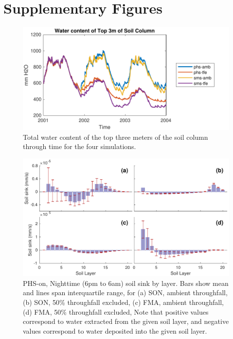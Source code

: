 \documentclass[draft,linenumbers]{agujournal}
\begin{document}
  
  



  


\clearpage

\appendix

\section{Supplementary Figures}

      \begin{figure}[h]
     \centering
     \includegraphics[width=30pc]{../figs2/top3m.pdf}
     \caption{Total water content of the top three meters of the soil column through time for the four simulations.}
     \label{top3m}
  \end{figure}
  \clearpage

    \begin{figure}[h]
     \centering
     \includegraphics[width=30pc]{../figs2/fig10.pdf}
     \caption{PHS-on, Nighttime (6pm to 6am)  soil sink by layer.
          Bars show mean and lines span interquartile range, for 
     (a) SON, ambient throughfall,
     (b) SON, 50\% throughfall excluded,
     (c) FMA, ambient throughfall,
     (d) FMA, 50\% throughfall excluded,
     Note that positive values correspond to water extracted from the given soil layer, 
     and negative values correspond to water deposited into the given soil layer.}
     \label{fig10}
  \end{figure}
  \clearpage
  
\end{document}
